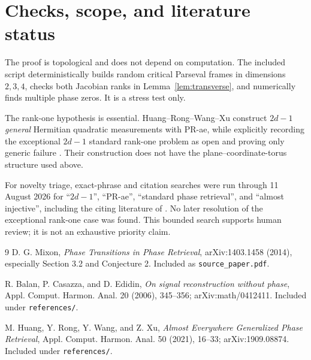 \documentclass[10pt]{article}
\begin{document}
\section*{Checks, scope, and literature status}

The proof is topological and does not depend on computation.  The included
script  deterministically builds
random critical Parseval frames in dimensions \(2,3,4\), checks both
Jacobian ranks in Lemma~\ref{lem:transverse}, and numerically finds multiple
phase zeros.  It is a stress test only.

The rank-one hypothesis is essential.  Huang--Rong--Wang--Xu construct
\(2d-1\) \emph{general} Hermitian quadratic measurements with PR-ae, while
explicitly recording the exceptional \(2d-1\) standard rank-one problem as
open and proving only generic failure \cite[Section 5, Theorem 5.3]{HRWX}.
Their construction does not have the plane--coordinate-torus structure used
above.

For novelty triage, exact-phrase and citation searches were run through
11 August 2026 for ``\(2d-1\)'', ``PR-ae'', ``standard phase retrieval'', and
``almost injective'', including the citing literature of \cite{HRWX}.  No
later resolution of the exceptional rank-one case was found.  This bounded
search supports human review; it is not an exhaustive priority claim.

\begin{thebibliography}{9}
D. G. Mixon, \emph{Phase Transitions in Phase Retrieval}, arXiv:1403.1458
(2014), especially Section 3.2 and Conjecture 2.  Included as
\texttt{source\_paper.pdf}.

R. Balan, P. Casazza, and D. Edidin, \emph{On signal reconstruction without
phase}, Appl. Comput. Harmon. Anal. 20 (2006), 345--356; arXiv:math/0412411.
Included under \texttt{references/}.

M. Huang, Y. Rong, Y. Wang, and Z. Xu, \emph{Almost Everywhere Generalized
Phase Retrieval}, Appl. Comput. Harmon. Anal. 50 (2021), 16--33;
arXiv:1909.08874.  Included under \texttt{references/}.
\end{thebibliography}
\end{document}
